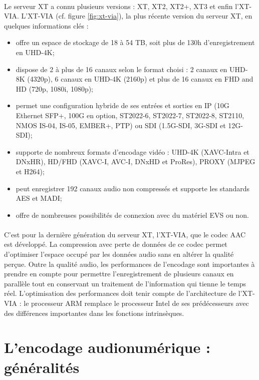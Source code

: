\documentclass{article}
\begin{document}
    \paragraph{}
    Le serveur XT a connu plusieurs versions : XT, XT2, XT2+, XT3 et enfin l'XT-VIA. L'XT-VIA (cf. figure \ref{fig:xt-via}), la plus récente version du serveur XT, en quelques informations clés\cite{EVS:products} :
    \begin{itemize}
        \item offre un espace de stockage de 18 à 54 TB, soit plus de 130h d'enregistrement en UHD-4K;
        \item dispose de 2 à plus de 16 canaux selon le format choisi : 2 canaux en UHD-8K (4320p), 6 canaux en UHD-4K (2160p) et plus de 16 canaux en FHD and HD (720p, 1080i, 1080p);
        \item permet une configuration hybride de ses entrées et sorties en IP (10G Ethernet SFP+, 100G en option, ST2022-6, ST2022-7, ST2022-8, ST2110, NMOS IS-04, IS-05, EMBER+, PTP) ou SDI (1.5G-SDI, 3G-SDI et 12G-SDI);
        \item supporte de nombreux formats d'encodage vidéo : UHD-4K (XAVC-Intra et DNxHR), HD/FHD (XAVC-I, AVC-I, DNxHD et ProRes), PROXY (MJPEG et H264);
        \item peut enregistrer 192 canaux audio non compressés et supporte les standards AES et MADI;
        \item offre de nombreuses possibilités de connexion avec du matériel EVS ou non.
    \end{itemize}

    \paragraph{}
    C'est pour la dernière génération du serveur XT, l'XT-VIA, que le codec AAC est développé. La compression avec perte de données de ce codec permet d'optimiser l'espace occupé par les données audio sans en altérer la qualité perçue. Outre la qualité audio, les performances de l'encodage sont importantes à prendre en compte pour permettre l'enregistrement de plusieurs canaux en parallèle tout en conservant un traitement de l'information qui tienne le temps réel. L'optimisation des performances doit tenir compte de l'architecture de l'XT-VIA : le processeur ARM remplace le processeur Intel de ses prédécesseurs avec des différences importantes dans les fonctions intrinsèques.


    \newpage
    \section{L'encodage audionumérique : généralités}
\end{document}
